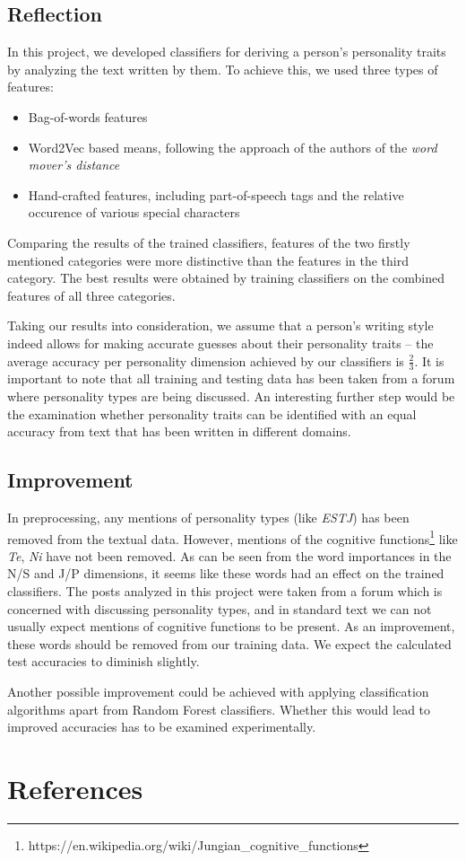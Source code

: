 \documentclass[12pt]{elsarticle}
\begin{document}
\subsection{Reflection}
In this project, we developed classifiers for deriving a person's personality traits by analyzing the text written by them. To achieve this, we used three types of features:
\begin{itemize}
\item Bag-of-words features
\item Word2Vec based means, following the approach of the authors of the \textit{word mover's distance}
\item Hand-crafted features, including part-of-speech tags and the relative occurence of various special characters
\end{itemize}
Comparing the results of the trained classifiers, features of the two firstly mentioned categories were more distinctive than the features in the third category. The best results were obtained by training classifiers on the combined features of all three categories.


Taking our results into consideration, we assume that a person's writing style indeed allows for making accurate guesses about their personality traits -- the average accuracy per personality dimension achieved by our classifiers is $\frac{2}{3}$. It is important to note that all training and testing data has been taken from a forum where personality types are being discussed. An interesting further step would be the examination whether personality traits can be identified with an equal accuracy from text that has been written in different domains.





\subsection{Improvement}
In preprocessing, any mentions of personality types (like \textit{ESTJ}) has been removed from the textual data. However, mentions of the cognitive functions\footnote{https://en.wikipedia.org/wiki/Jungian\_cognitive\_functions} like \textit{Te}, \textit{Ni} have not been removed. As can be seen from the word importances in the N/S and J/P dimensions, it seems like these words had an effect on the trained classifiers. The posts analyzed in this project were taken from a forum which is concerned with discussing personality types, and in standard text we can not usually expect mentions of cognitive functions to be present. As an improvement, these words should be removed from our training data. We expect the calculated test accuracies to diminish slightly.

Another possible improvement could be achieved with applying classification algorithms apart from Random Forest classifiers. Whether this would lead to improved accuracies has to be examined experimentally.











\clearpage
\section{References}


\end{document}

